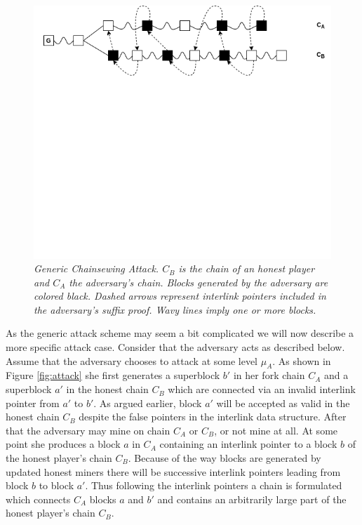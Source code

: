 \documentclass[11pt,a4paper]{article}
\begin{document}
\begin{figure}[h]
	\begin{center}
		\includegraphics[scale=0.55]{figures/generic_chainsewing_attack.png}
	\end{center}
	\caption{\textit{Generic Chainsewing Attack. $C_B$ is the chain of an honest player and $C_A$ the adversary's chain. Blocks generated by the adversary are colored black. Dashed arrows represent interlink pointers included in the adversary's suffix proof. Wavy lines imply one or more blocks.}}
	\label{fig:generic_attack}
\end{figure}

As the generic attack scheme may seem a bit complicated we will now describe a more specific attack case. Consider that the adversary acts as described below. 
Assume that the adversary chooses to attack at some level $\mu_A$. As shown in Figure \ref{fig:attack} she first generates a superblock $b'$ in her fork chain $C_A$ and a superblock $a'$ in the honest chain $C_B$ which are connected via an invalid interlink pointer from $a'$ to $b'$. As argued earlier, block $a'$ will be accepted as valid in the honest chain $C_B$ despite the false pointers in the interlink data structure. After that the adversary may mine on chain $C_A$ or $C_B$, or not mine at all. At some point she produces a block $a$ in $C_A$ containing an interlink pointer to a block $b$ of the honest player's chain $C_B$. Because of the way blocks are generated by updated honest miners there will be successive interlink pointers leading from block $b$ to block $a'$. Thus following the interlink pointers a chain is formulated which connects $C_A$ blocks $a$ and $b'$ and contains an arbitrarily large part of the honest player's chain $C_B$.
\end{document}
